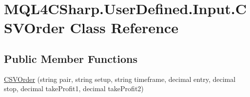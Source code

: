 \hypertarget{class_m_q_l4_c_sharp_1_1_user_defined_1_1_input_1_1_c_s_v_order}{}\section{M\+Q\+L4\+C\+Sharp.\+User\+Defined.\+Input.\+C\+S\+V\+Order Class Reference}
\label{class_m_q_l4_c_sharp_1_1_user_defined_1_1_input_1_1_c_s_v_order}
\subsection*{Public Member Functions}
\begin{DoxyCompactItemize}
\item 
\hyperlink{class_m_q_l4_c_sharp_1_1_user_defined_1_1_input_1_1_c_s_v_order_a153f1a5eff358b8967fc721687697907}{C\+S\+V\+Order} (string pair, string setup, string timeframe, decimal entry, decimal stop, decimal take\+Profit1, decimal take\+Profit2)
\end{DoxyCompactItemize}
